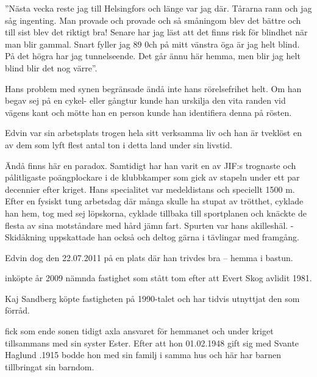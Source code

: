 ”Nästa vecka reste jag till Helsingfors och länge var jag där. Tårarna rann och jag såg ingenting. Man provade och provade och så småningom blev det bättre och till sist blev det riktigt bra! Senare har jag läst att det finns risk för blindhet när man blir gammal. Snart fyller jag 89 0ch på mitt vänstra öga är jag helt blind. På det högra har jag tunnelseende. Det går ännu här hemma, men blir jag helt blind blir det nog värre”.

Hans problem med synen begränsade ändå inte hans rörelsefrihet helt. Om han begav sej på en cykel- eller gångtur kunde han urskilja den vita randen vid vägens kant och mötte han en person kunde han identifiera denna på rösten.

Edvin var sin arbetsplats trogen hela sitt verksamma liv och han är tveklöst en av dem som lyft flest antal ton i detta land under sin livstid.

Ändå finns här en paradox. Samtidigt har han varit en av JIF:s trognaste och pålitligaste poängplockare i de klubbkamper som gick av stapeln under ett par decennier efter kriget. Hans specialitet var medeldistans och speciellt 1500 m. Efter en fysiskt tung arbetsdag där många skulle ha stupat av trötthet, cyklade han hem, tog med sej löpskorna, cyklade tillbaka till sportplanen och knäckte de flesta av sina motståndare med  hård jämn fart. Spurten var hans akilleshäl. - Skidåkning uppskattade han också och deltog gärna i tävlingar med framgång.

Edvin dog den 22.07.2011 på en plats där han trivdes bra – hemma i bastun.




 inköpte år 2009 nämnda fastighet som stått tom efter att Evert Skog avlidit 1981.


Kaj Sandberg köpte fastigheten på 1990-talet och har tidvis utnyttjat den som förråd.


 fick som ende sonen tidigt axla ansvaret för hemmanet och under kriget tillsammans med sin syster Ester. Efter att hon 01.02.1948 gift sig med Svante Haglund .1915 bodde hon med sin familj i samma hus och här har barnen tillbringat sin barndom.
\begin{jhchildren}
  \item {}
  \item {}
  \item {}
  \item {}
  \item {}
\end{jhchildren}

